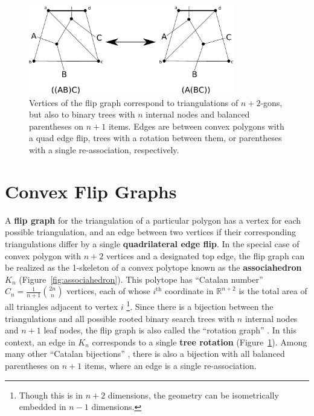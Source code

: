 \documentclass[english]{socg-lipics-v2021}
\begin{document}
\begin{figure}
    \centering
    \includegraphics[width=0.8\textwidth]{correspondences.pdf}
    \caption{Vertices of the flip graph correspond to triangulations of $n+2$-gons, but also to binary trees with $n$ internal nodes and balanced parentheses on $n+1$ items.  Edges are between convex polygons with a quad edge flip, trees with a rotation between them, or parentheses with a single re-association, respectively.}
    \label{fig:correspondences}
\end{figure}



\section{Convex Flip Graphs}

A \textbf{flip graph} for the triangulation of a particular polygon has a vertex for each possible triangulation, and an edge between two vertices if their corresponding triangulations differ by a single \textbf{quadrilateral edge flip}.  In the special case of convex polygon with $n+2$ vertices and a designated top edge, the flip graph can be realized as the 1-skeleton of a convex polytope known as the \textbf{associahedron $K_n$} (Figure~\ref{fig:associahedron}).  This polytope has ``Catalan number'' $C_n = \frac{1}{n+1} \binom{2n}{n}$ vertices, each of whose $i^{\text{th}}$ coordinate in $\mathbb{R}^{n+2}$ is the total area of all triangles adjacent to vertex $i$ \footnote{Though this is in $n+2$ dimensions, the geometry can be isometrically embedded in $n-1$ dimensions.}.  Since there is a bijection between the triangulations and all possible rooted binary search trees with $n$ internal nodes and $n+1$ leaf nodes, the flip graph is also called the ``rotation graph''  \cite{lucas1987rotation}.  In this context, an edge in $K_n$ corresponds to a single {\bf tree rotation} (Figure~\ref{fig:correspondences}).  Among many other ``Catalan bijections'' \cite{roman2015introduction}, there is also a bijection with all balanced parentheses on $n+1$ items, where an edge is a single re-association.
\end{document}
